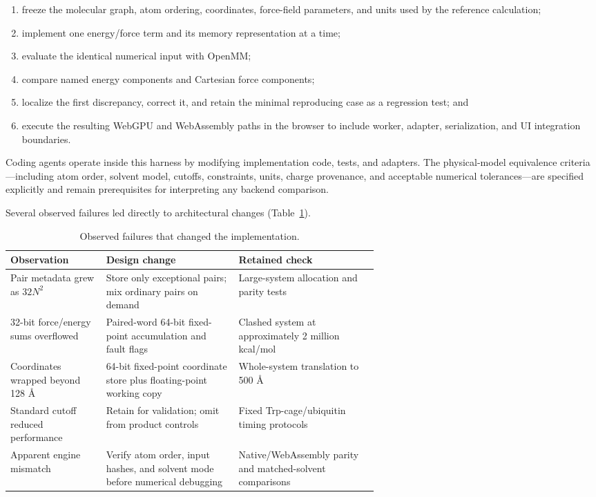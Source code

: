 \documentclass[11pt]{article}
\begin{document}
\begin{small}
\begin{enumerate}[leftmargin=*]
\item freeze the molecular graph, atom ordering, coordinates, force-field parameters, and units used by the reference calculation;
\item implement one energy/force term and its memory representation at a time;
\item evaluate the identical numerical input with OpenMM;
\item compare named energy components and Cartesian force components;
\item localize the first discrepancy, correct it, and retain the minimal reproducing case as a regression test; and
\item execute the resulting WebGPU and WebAssembly paths in the browser to include worker, adapter, serialization, and UI integration boundaries.
\end{enumerate}

Coding agents operate inside this harness by modifying implementation code, tests, and adapters. The physical-model equivalence criteria---including atom order, solvent model, cutoffs, constraints, units, charge provenance, and acceptable numerical tolerances---are specified explicitly and remain prerequisites for interpreting any backend comparison.

Several observed failures led directly to architectural changes (Table~\ref{tab:appA_failures}).

\begin{table}[htbp]
\centering\small
\caption{Observed failures that changed the implementation.}
\label{tab:appA_failures}
\begin{tabularx}{\linewidth}{@{}p{0.26\linewidth}p{0.36\linewidth}X@{}}
\toprule
\textbf{Observation} & \textbf{Design change} & \textbf{Retained check}\\
\midrule
Pair metadata grew as $32N^2$ & Store only exceptional pairs; mix ordinary pairs on demand & Large-system allocation and parity tests\\
32-bit force/energy sums overflowed & Paired-word 64-bit fixed-point accumulation and fault flags & Clashed system at approximately 2 million kcal/mol\\
Coordinates wrapped beyond 128 \AA{} & 64-bit fixed-point coordinate store plus floating-point working copy & Whole-system translation to 500 \AA{}\\
Standard cutoff reduced performance & Retain for validation; omit from product controls & Fixed Trp-cage/ubiquitin timing protocols\\
Apparent engine mismatch & Verify atom order, input hashes, and solvent mode before numerical debugging & Native/WebAssembly parity and matched-solvent comparisons\\
\bottomrule
\end{tabularx}
\end{table}


\end{small}
\end{document}
